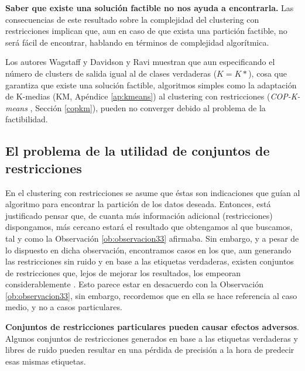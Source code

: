 \begin{observacion}
	
	\textbf{Saber que existe una solución factible no nos ayuda a encontrarla.} Las consecuencias de este resultado sobre la complejidad del clustering con restricciones implican que, aun en caso de que exista una partición factible, no será fácil de encontrar, hablando en términos de complejidad algorítmica. \cite{davidson2007survey}
	\label{ob:observacion34}
	
\end{observacion} 

Los autores Wagstaff \cite{wagstaff2002intelligent} y Davidson y Ravi \cite{davidson2007hierarchical} muestran que aun especificando el número de clusters de salida igual al de clases verdaderas ($K = K*$), cosa que garantiza que existe una solución factible, algoritmos simples como la adaptación de K-medias (\acs{KM}, Apéndice \ref{ap:kmeans}) al clustering con restricciones (\textit{COP-K-means} \cite{wagstaff2001constrained}, Sección \ref{copkm}), pueden no converger debido al problema de la factibilidad.

\subsection{El problema de la utilidad de conjuntos de restricciones} \label{ProbRestr}

En el clustering con restricciones se asume que éstas son indicaciones que guían al algoritmo para encontrar la partición de los datos deseada. Entonces, está justificado pensar que, de cuanta más información adicional (restricciones) dispongamos, más cercano estará el resultado que obtengamos al que buscamos, tal y como la Observación \ref{ob:observacion33} afirmaba. Sin embargo, y a pesar de lo dispuesto en dicha observación, encontramos casos en los que, aun generando las restricciones sin ruido y en base a las etiquetas verdaderas, existen conjuntos de restricciones que, lejos de mejorar los resultados, los empeoran considerablemente \cite{davidson2006proceedings}. Esto parece estar en desacuerdo con la Observación \ref{ob:observacion33}, sin embargo, recordemos que en ella se hace referencia al caso medio, y no a casos particulares.

\begin{observacion}
	
	\textbf{Conjuntos de restricciones particulares pueden causar efectos adversos}. Algunos conjuntos de restricciones generados en base a las etiquetas verdaderas y libres de ruido pueden resultar en una pérdida de precisión a la hora de predecir esas mismas etiquetas. \cite{davidson2007survey}
	
\end{observacion}

